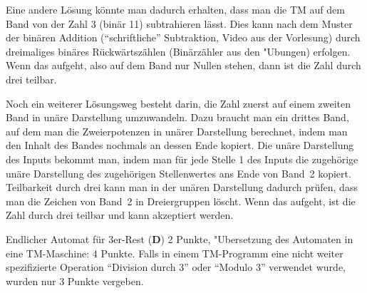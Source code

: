 \begin{loesung}
Eine andere Lösung könnte man dadurch erhalten, dass man die TM
auf dem Band von der Zahl 3 (binär 11) subtrahieren lässt. Dies
kann nach dem Muster der binären Addition (``schriftliche'' Subtraktion,
Video aus der Vorlesung)
durch dreimaliges binäres Rückwärtszählen (Binärzähler aus den
"Ubungen) erfolgen.
Wenn
das aufgeht, also auf dem Band nur Nullen stehen, dann ist die
Zahl durch drei teilbar.

Noch ein weiterer Lösungsweg besteht darin, die Zahl zuerst auf einem zweiten
Band in unäre Darstellung umzuwandeln. Dazu braucht man ein drittes Band,
auf dem man die Zweierpotenzen in unärer Darstellung berechnet, indem
man den Inhalt des Bandes nochmals an dessen Ende kopiert. Die unäre
Darstellung des Inputs bekommt man, indem man für jede Stelle 1
des Inputs die zugehörige unäre Darstellung des zugehörigen Stellenwertes
ans Ende von Band~2 kopiert. Teilbarkeit durch drei kann man in der
unären Darstellung dadurch prüfen, dass man die Zeichen von Band~2
in Dreiergruppen löscht. Wenn das aufgeht, ist die Zahl durch drei teilbar
und kann akzeptiert werden.
\end{loesung}

\begin{bewertung}
Endlicher Automat für 3er-Rest ({\bf D}) 2 Punkte,
"Ubersetzung des Automaten in eine TM-Maschine: 4 Punkte.
Falls in einem TM-Programm eine nicht weiter spezifizierte Operation
``Division durch 3'' oder ``Modulo 3'' verwendet wurde, wurden
nur 3 Punkte vergeben.
\end{bewertung}
